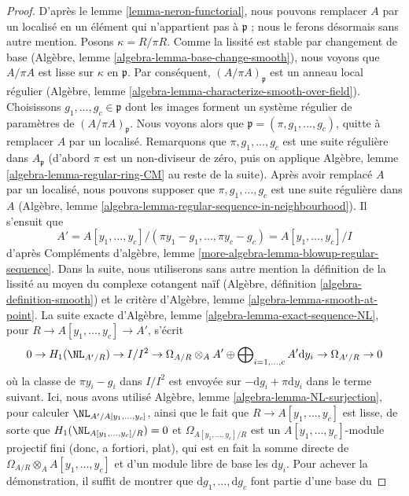 \begin{proof}
D'après le lemme \ref{lemma-neron-functorial}, nous pouvons remplacer $A$ par
un localisé en un élément qui n'appartient pas à $\mathfrak p$ ; nous le ferons
désormais sans autre mention. Posons $\kappa = R/\pi R$. Comme la lissité est
stable par changement de base
(Algèbre, lemme \ref{algebra-lemma-base-change-smooth}),
nous voyons que $A/\pi A$ est lisse sur $\kappa$ en $\mathfrak p$.
Par conséquent, $(A/\pi A)_\mathfrak p$ est un anneau local régulier
(Algèbre, lemme \ref{algebra-lemma-characterize-smooth-over-field}).
Choisissons $g_1, \ldots, g_c \in \mathfrak p$ dont les images forment
un système régulier de paramètres de $(A/\pi A)_\mathfrak p$.
Nous voyons alors que $\mathfrak p = (\pi, g_1, \ldots, g_c)$,
quitte à remplacer $A$ par un localisé.
Remarquons que $\pi, g_1, \ldots, g_c$ est une suite régulière
dans $A_\mathfrak p$ (d'abord $\pi$ est un non-diviseur de zéro, puis on applique
Algèbre, lemme \ref{algebra-lemma-regular-ring-CM}
au reste de la suite).
Après avoir remplacé $A$ par un localisé, nous pouvons supposer que
$\pi, g_1, \ldots, g_c$ est une suite régulière dans $A$
(Algèbre, lemme \ref{algebra-lemma-regular-sequence-in-neighbourhood}).
Il s'ensuit que
$$
A' = A[y_1, \ldots, y_c]/(\pi y_1 - g_1, \ldots, \pi y_c - g_c) =
A[y_1, \ldots, y_c]/I
$$
d'après Compléments d'algèbre, lemme \ref{more-algebra-lemma-blowup-regular-sequence}.
Dans la suite, nous utiliserons sans autre mention la définition de la lissité
au moyen du complexe cotangent naïf (Algèbre, définition \ref{algebra-definition-smooth})
et le critère d'Algèbre, lemme \ref{algebra-lemma-smooth-at-point}.
La suite exacte d'Algèbre, lemme \ref{algebra-lemma-exact-sequence-NL},
pour $R \to A[y_1, \ldots, y_c] \to A'$, s'écrit
$$
0 \to H_1(\NL_{A'/R}) \to I/I^2 \to
\Omega_{A/R} \otimes_A A' \oplus
\bigoplus\nolimits_{i = 1, \ldots, c} A' \text{d}y_i \to
\Omega_{A'/R} \to 0
$$
où la classe de $\pi y_i - g_i$ dans $I/I^2$ est envoyée
sur $- \text{d}g_i + \pi \text{d}y_i$ dans le terme suivant.
Ici, nous avons utilisé Algèbre, lemme \ref{algebra-lemma-NL-surjection},
pour calculer $\NL_{A'/A[y_1, \ldots, y_c]}$, ainsi que le fait que
$R \to A[y_1, \ldots, y_c]$ est lisse, de sorte que
$H_1(\NL_{A[y_1, \ldots, y_c]/R}) = 0$ et
$\Omega_{A[y_1, \ldots, y_c]/R}$ est un
$A[y_1, \ldots, y_c]$-module projectif fini (donc, a fortiori, plat),
qui est en fait la somme directe de
$\Omega_{A/R} \otimes_A A[y_1, \ldots, y_c]$ et d'un module libre
de base les $\text{d}y_i$. Pour achever la démonstration, il suffit de
montrer que $\text{d}g_1, \ldots, \text{d}g_c$ font partie d'une base du

\end{proof}
